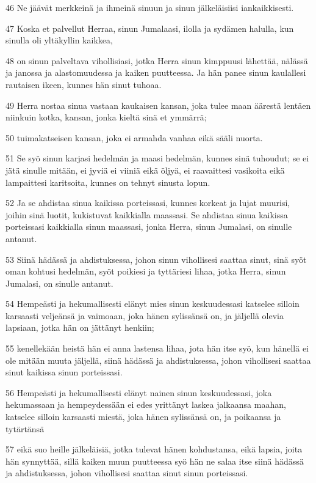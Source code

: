 \par 46 Ne jäävät merkkeinä ja ihmeinä sinuun ja sinun jälkeläisiisi iankaikkisesti.
\par 47 Koska et palvellut Herraa, sinun Jumalaasi, ilolla ja sydämen halulla, kun sinulla oli yltäkyllin kaikkea,
\par 48 on sinun palveltava vihollisiasi, jotka Herra sinun kimppuusi lähettää, nälässä ja janossa ja alastomuudessa ja kaiken puutteessa. Ja hän panee sinun kaulallesi rautaisen ikeen, kunnes hän sinut tuhoaa.
\par 49 Herra nostaa sinua vastaan kaukaisen kansan, joka tulee maan äärestä lentäen niinkuin kotka, kansan, jonka kieltä sinä et ymmärrä;
\par 50 tuimakatseisen kansan, joka ei armahda vanhaa eikä sääli nuorta.
\par 51 Se syö sinun karjasi hedelmän ja maasi hedelmän, kunnes sinä tuhoudut; se ei jätä sinulle mitään, ei jyviä ei viiniä eikä öljyä, ei raavaittesi vasikoita eikä lampaittesi karitsoita, kunnes on tehnyt sinusta lopun.
\par 52 Ja se ahdistaa sinua kaikissa porteissasi, kunnes korkeat ja lujat muurisi, joihin sinä luotit, kukistuvat kaikkialla maassasi. Se ahdistaa sinua kaikissa porteissasi kaikkialla sinun maassasi, jonka Herra, sinun Jumalasi, on sinulle antanut.
\par 53 Siinä hädässä ja ahdistuksessa, johon sinun vihollisesi saattaa sinut, sinä syöt oman kohtusi hedelmän, syöt poikiesi ja tyttäriesi lihaa, jotka Herra, sinun Jumalasi, on sinulle antanut.
\par 54 Hempeästi ja hekumallisesti elänyt mies sinun keskuudessasi katselee silloin karsaasti veljeänsä ja vaimoaan, joka hänen sylissänsä on, ja jäljellä olevia lapsiaan, jotka hän on jättänyt henkiin;
\par 55 kenellekään heistä hän ei anna lastensa lihaa, jota hän itse syö, kun hänellä ei ole mitään muuta jäljellä, siinä hädässä ja ahdistuksessa, johon vihollisesi saattaa sinut kaikissa sinun porteissasi.
\par 56 Hempeästi ja hekumallisesti elänyt nainen sinun keskuudessasi, joka hekumassaan ja hempeydessään ei edes yrittänyt laskea jalkaansa maahan, katselee silloin karsaasti miestä, joka hänen sylissänsä on, ja poikaansa ja tytärtänsä
\par 57 eikä suo heille jälkeläisiä, jotka tulevat hänen kohdustansa, eikä lapsia, joita hän synnyttää, sillä kaiken muun puutteessa syö hän ne salaa itse siinä hädässä ja ahdistuksessa, johon vihollisesi saattaa sinut sinun porteissasi.
